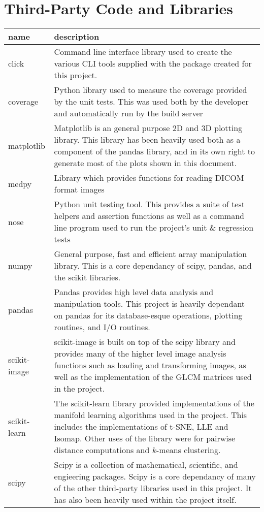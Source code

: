 \chapter{Third-Party Code and Libraries}

\begin{table}[H]
\centering
\begin{tabular}{l p{14cm}}
\toprule
         name & description \\
\midrule
        click & Command line interface library used to create the various CLI tools supplied with the package created for this project.\\ \hline
     coverage & Python library used to measure the coverage provided by the unit tests. This was used both by the developer and automatically run by the build server \\ \hline
   matplotlib & Matplotlib is an general purpose 2D and 3D plotting library. This library has been heavily used both as a component of the pandas library, and in its own right to generate most of the plots shown in this document. \\ \hline
        medpy & Library which provides functions for reading DICOM format images \\ \hline
         nose & Python unit testing tool. This provides a suite of test helpers and assertion functions as well as a command line program used to run the project's unit \& regression tests \\ \hline
        numpy & General purpose, fast and efficient array manipulation library. This is a core dependancy of scipy, pandas, and the scikit libraries. \\ \hline
       pandas & Pandas provides high level data analysis and manipulation tools. This project is heavily dependant on pandas for its database-esque operations, plotting routines, and I/O routines.\\ \hline
 scikit-image & scikit-image is built on top of the scipy library and provides many of the higher level image analysis functions such as loading and transforming images, as well as the implementation of the GLCM matrices used in the project.\\ \hline
 scikit-learn & The scikit-learn library provided implementations of the manifold learning algorithms used in the project. This includes the implementations of t-SNE, LLE and Isomap. Other uses of the library were for pairwise distance computations and $k$-means clustering. \\ \hline
        scipy & Scipy is a collection of mathematical, scientific, and engieering packages. Scipy is a core dependancy of many of the other third-party libraries used in this project. It has also been heavily used within the project itself.\\ \hline

\end{tabular}
\end{table}
